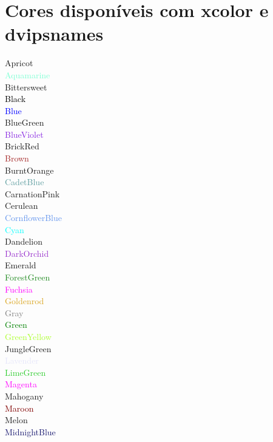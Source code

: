 \documentclass{article}
\begin{document}
	\section*{Cores disponíveis com xcolor e dvipsnames}
	
	\textcolor{Apricot}{Apricot}\\
	\textcolor{Aquamarine}{Aquamarine}\\
	\textcolor{Bittersweet}{Bittersweet}\\
	\textcolor{Black}{Black}\\
	\textcolor{Blue}{Blue}\\
	\textcolor{BlueGreen}{BlueGreen}\\
	\textcolor{BlueViolet}{BlueViolet}\\
	\textcolor{BrickRed}{BrickRed}\\
	\textcolor{Brown}{Brown}\\
	\textcolor{BurntOrange}{BurntOrange}\\
	\textcolor{CadetBlue}{CadetBlue}\\
	\textcolor{CarnationPink}{CarnationPink}\\
	\textcolor{Cerulean}{Cerulean}\\
	\textcolor{CornflowerBlue}{CornflowerBlue}\\
	\textcolor{Cyan}{Cyan}\\
	\textcolor{Dandelion}{Dandelion}\\
	\textcolor{DarkOrchid}{DarkOrchid}\\
	\textcolor{Emerald}{Emerald}\\
	\textcolor{ForestGreen}{ForestGreen}\\
	\textcolor{Fuchsia}{Fuchsia}\\
	\textcolor{Goldenrod}{Goldenrod}\\
	\textcolor{Gray}{Gray}\\
	\textcolor{Green}{Green}\\
	\textcolor{GreenYellow}{GreenYellow}\\
	\textcolor{JungleGreen}{JungleGreen}\\
	\textcolor{Lavender}{Lavender}\\
	\textcolor{LimeGreen}{LimeGreen}\\
	\textcolor{Magenta}{Magenta}\\
	\textcolor{Mahogany}{Mahogany}\\
	\textcolor{Maroon}{Maroon}\\
	\textcolor{Melon}{Melon}\\
	\textcolor{MidnightBlue}{MidnightBlue}\\
\end{document}
